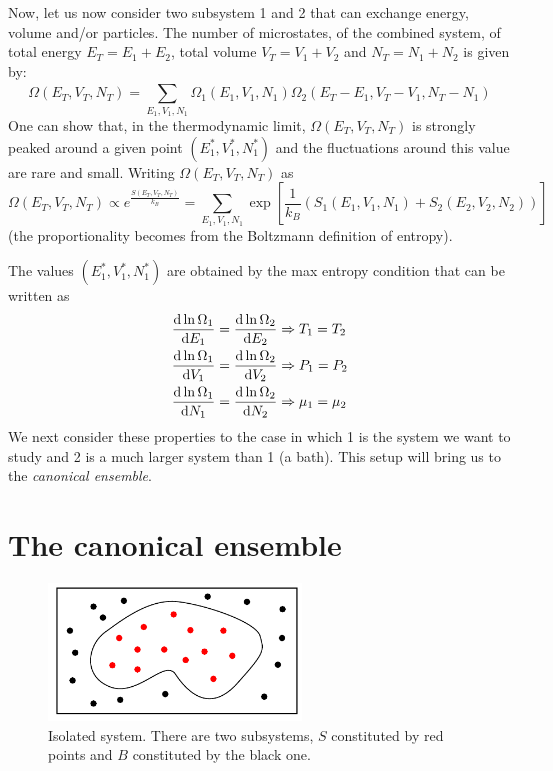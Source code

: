 \documentclass[../main/main.tex]{subfiles}
\begin{document}
Now, let us now consider two subsystem 1 and 2 that can exchange energy, volume and/or particles.
The number of microstates, of the combined system, of total energy \( E_T = E_1 + E_2 \), total volume \( V_T = V_1 + V_2 \) and \( N_T = N_1 + N_2 \) is given by:
\begin{equation}
  \Omega (E_T,V_T,N_T) = \sum_{E_1,V_1,N_1}^{} \Omega _1 (E_1,V_1,N_1) \Omega _2 (E_T - E_1,V_T-V_1,N_T-N_1)
\end{equation}
One can show that, in the thermodynamic limit, \(  \Omega (E_T,V_T,N_T) \) is strongly peaked around a given point \( (E_1^*,V_1^*,N_1^*) \) and the fluctuations around this value are rare and small. Writing \( \Omega (E_T,V_T,N_T)  \) as
\begin{equation}
  \Omega (E_T,V_T,N_T) \propto e^{\frac{S(E_T,V_T,N_T) }{k_B}} = \sum_{E_1,V_1,N_1}^{} \exp[ \frac{1}{k_B} (S_1 (E_1,V_1, N_1) + S_2 (E_2,V_2, N_2) ) ]
\end{equation}
(the proportionality becomes from the Boltzmann definition of entropy).

The values \( (E_1^*,V_1^*,N_1^*) \) are obtained by the max entropy condition that can be written as
\begin{subequations}
\begin{align}
  \dv{\ln{\Omega _1} }{E_1}  &= \dv{\ln{\Omega _2} }{E_2} \Rightarrow  T_1 = T_2 \\
  \dv{\ln{\Omega _1} }{V_1}  &= \dv{\ln{\Omega _2} }{V_2} \Rightarrow  P_1 = P_2 \\
  \dv{\ln{\Omega _1} }{N_1}  &= \dv{\ln{\Omega _2} }{N_2} \Rightarrow  \mu _1 = \mu _2
\end{align}
\end{subequations}
We next consider these properties to the case in which 1 is the system we want to study and 2 is a much larger system than 1 (a bath). This setup will bring us to the \emph{canonical ensemble}.

\section{The canonical ensemble}

\begin{figure}[h!]
\centering
\includegraphics[width=0.6\textwidth]{../lessons/4_image/1.pdf}
\caption{\label{fig:4_1} Isolated system. There are two subsystems, \( S \)  constituted by red points and \( B \) constituted by the black one.}
\end{figure}
\end{document}
